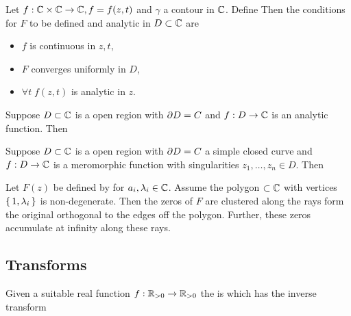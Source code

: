 \documentclass{article}
\begin{document}
\begin{theorem}\label{thm:BVP:AnalyticIntegral}
Let $f : \mathbb{C} \times \mathbb{C} \to \mathbb{C}, f=f(z,t)$ and $\gamma$ a contour in $\mathbb{C}$. Define
Then the conditions for $F$ to be defined and analytic in $D \subset \mathbb{C}$ are 
\begin{itemize}
    \item $f$ is continuous in $z,t$,
    \item $F$ converges uniformly in $D$,
    \item $\forall t \; f(z,t)$ is analytic in $z$. 
\end{itemize}
\end{theorem}

\begin{theorem}\label{thm:BVP:Cauchy}
Suppose $D\subset\mathbb{C}$ is a open region with  $\partial D = C$ and $f:D \to \mathbb{C}$ is an analytic function. Then 
\end{theorem}

\begin{theorem}
Suppose $D\subset\mathbb{C}$ is a open region with  $\partial D = C$ a simple closed curve and $f:D \to \mathbb{C}$ is a meromorphic function with singularities $z_1, \dots, z_n \in D$. Then 
\end{theorem}

\begin{theorem}\label{thm:BVPs:AccumulatingZeros}
Let $F(z)$ be defined by 
for $a_i, \lambda_i \in \mathbb{C}$. Assume the polygon $\subset \mathbb{C}$ with vertices $\set{1,\lambda_i}$ is non-degenerate. Then the zeros of $F$ are clustered along the rays form the original orthogonal to the edges off the polygon. Further, these zeros accumulate at infinity along these rays. 
\end{theorem}
\subsection{Transforms}

\begin{definition}
Given a suitable real function $f : \mathbb{R}_{>0} \to \mathbb{R}_{>0}$ the  is 
which has the inverse transform 
\end{definition}
\end{document}
